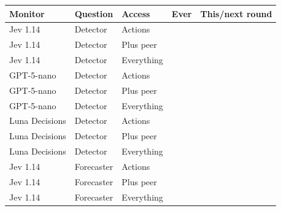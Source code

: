 \begin{tabular}{lllcc}
\toprule
Monitor & Question & Access & Ever & This/next round \\
\midrule
Jev 1.14 & Detector & Actions & \qwenMonJevDetectActionsEver{} \qwenMonJevDetectActionsEverCI{} & \qwenMonJevDetectActionsNear{} \qwenMonJevDetectActionsNearCI{} \\
Jev 1.14 & Detector & Plus peer & \qwenMonJevDetectPeerEver{} \qwenMonJevDetectPeerEverCI{} & \qwenMonJevDetectPeerNear{} \qwenMonJevDetectPeerNearCI{} \\
Jev 1.14 & Detector & Everything & \qwenMonJevDetectAllEver{} \qwenMonJevDetectAllEverCI{} & \qwenMonJevDetectAllNear{} \qwenMonJevDetectAllNearCI{} \\
GPT-5-nano & Detector & Actions & \qwenMonNanoDetectActionsEver{} \qwenMonNanoDetectActionsEverCI{} & \qwenMonNanoDetectActionsNear{} \qwenMonNanoDetectActionsNearCI{} \\
GPT-5-nano & Detector & Plus peer & \qwenMonNanoDetectPeerEver{} \qwenMonNanoDetectPeerEverCI{} & \qwenMonNanoDetectPeerNear{} \qwenMonNanoDetectPeerNearCI{} \\
GPT-5-nano & Detector & Everything & \qwenMonNanoDetectAllEver{} \qwenMonNanoDetectAllEverCI{} & \qwenMonNanoDetectAllNear{} \qwenMonNanoDetectAllNearCI{} \\
Luna Decisions & Detector & Actions & \qwenMonLunaDetectActionsEver{} \qwenMonLunaDetectActionsEverCI{} & \qwenMonLunaDetectActionsNear{} \qwenMonLunaDetectActionsNearCI{} \\
Luna Decisions & Detector & Plus peer & \qwenMonLunaDetectPeerEver{} \qwenMonLunaDetectPeerEverCI{} & \qwenMonLunaDetectPeerNear{} \qwenMonLunaDetectPeerNearCI{} \\
Luna Decisions & Detector & Everything & \qwenMonLunaDetectAllEver{} \qwenMonLunaDetectAllEverCI{} & \qwenMonLunaDetectAllNear{} \qwenMonLunaDetectAllNearCI{} \\
Jev 1.14 & Forecaster & Actions & \qwenMonJevForecastActionsEver{} \qwenMonJevForecastActionsEverCI{} & \qwenMonJevForecastActionsNear{} \qwenMonJevForecastActionsNearCI{} \\
Jev 1.14 & Forecaster & Plus peer & \qwenMonJevForecastPeerEver{} \qwenMonJevForecastPeerEverCI{} & \qwenMonJevForecastPeerNear{} \qwenMonJevForecastPeerNearCI{} \\
Jev 1.14 & Forecaster & Everything & \qwenMonJevForecastAllEver{} \qwenMonJevForecastAllEverCI{} & \qwenMonJevForecastAllNear{} \qwenMonJevForecastAllNearCI{} \\

\end{tabular}
